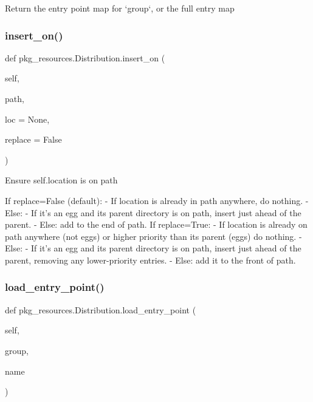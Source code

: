\begin{DoxyVerb}Return the entry point map for `group`, or the full entry map\end{DoxyVerb}
 \mbox{\label{classpkg__resources_1_1_distribution_a26864ad682f37623654f162a1d0a4c8b}} 
\subsubsection{\texorpdfstring{insert\+\_\+on()}{insert\_on()}}
{\footnotesize\ttfamily def pkg\+\_\+resources.\+Distribution.\+insert\+\_\+on (\begin{DoxyParamCaption}\item[{}]{self,  }\item[{}]{path,  }\item[{}]{loc = {\ttfamily None},  }\item[{}]{replace = {\ttfamily False} }\end{DoxyParamCaption})}

\begin{DoxyVerb}Ensure self.location is on path

If replace=False (default):
    - If location is already in path anywhere, do nothing.
    - Else:
      - If it's an egg and its parent directory is on path,
insert just ahead of the parent.
      - Else: add to the end of path.
If replace=True:
    - If location is already on path anywhere (not eggs)
      or higher priority than its parent (eggs)
      do nothing.
    - Else:
      - If it's an egg and its parent directory is on path,
insert just ahead of the parent,
removing any lower-priority entries.
      - Else: add it to the front of path.
\end{DoxyVerb}
 \mbox{\label{classpkg__resources_1_1_distribution_a2a3097439745646ac5be811f39c2aca8}} 
\subsubsection{\texorpdfstring{load\+\_\+entry\+\_\+point()}{load\_entry\_point()}}
{\footnotesize\ttfamily def pkg\+\_\+resources.\+Distribution.\+load\+\_\+entry\+\_\+point (\begin{DoxyParamCaption}\item[{}]{self,  }\item[{}]{group,  }\item[{}]{name }\end{DoxyParamCaption})}

